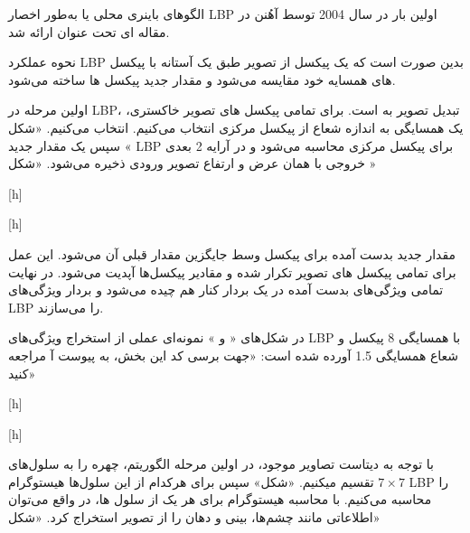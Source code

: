 
الگو‌های باینری محلی یا به‌طور اخصار LBP اولین بار در سال 2004 توسط آهُنن در مقاله ای تحت عنوان  ارائه شد. 

نحوه عملکرد LBP بدین صورت است که یک پیکسل از تصویر طبق یک آستانه با پیکسل های همسایه خود مقایسه می‌شود و مقدار جدید پیکسل ها ساخته می‌شود.

اولین مرحله در LBP، تبدیل تصویر  به  است. برای تمامی پیکسل های تصویر خاکستری، یک همسایگی به اندازه شعاع  از پیکسل مرکزی انتخاب می‌کنیم. انتخاب می‌کنیم. «شکل » سپس یک مقدار جدید LBP برای پیکسل مرکزی محاسبه می‌شود و در آرایه 2 بعدی خروجی با همان عرض و ارتفاع تصویر ورودی ذخیره می‌شود. «شکل » ~

[h]



[h]

مقدار جدید بدست آمده برای پیکسل وسط جایگزین مقدار قبلی آن می‌شود. این عمل برای تمامی پیکسل های تصویر تکرار شده و مقادیر پیکسل‌ها آپدیت می‌شود. در نهایت تمامی ویژگی‌های بدست آمده در یک بردار کنار هم چیده می‌شود و بردار ویژگی‌های LBP را می‌سازند. ~

در شکل‌های « و  » نمونه‌ای عملی از استخراج ویژگی‌های LBP با همسایگی 8 پیکسل و شعاع همسایگی 1.5 آورده شده است: «جهت برسی کد این بخش، به پیوست آ مراجعه کنید»

[h]

[h]



با توجه به دیتاست تصاویر موجود، در اولین مرحله الگوریتم، چهره را به سلول‌های $ 7\times7 $ تقسیم میکنیم. «شکل» سپس برای هرکدام از این سلول‌ها هیستوگرام LBP را محاسبه می‌کنیم. با محاسبه هیستوگرام برای هر یک از سلول ها، در واقع می‌توان اطلاعاتی مانند چشم‌ها، بینی و دهان را از تصویر استخراج کرد. «شکل»

